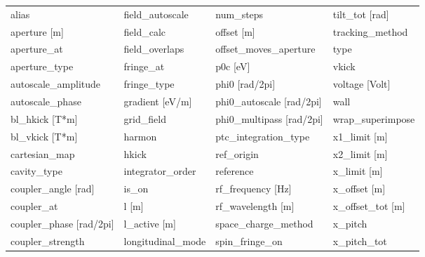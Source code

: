  \begin{tabular}{llll} \toprule
alias                            & field_autoscale                  & num_steps                        & tilt_tot [rad]                   \\
aperture [m]                     & field_calc                       & offset [m]                       & tracking_method                  \\
aperture_at                      & field_overlaps                   & offset_moves_aperture            & type                             \\
aperture_type                    & fringe_at                        & p0c [eV]                         & vkick                            \\
autoscale_amplitude              & fringe_type                      & phi0 [rad/2pi]                   & voltage [Volt]                   \\
autoscale_phase                  & gradient [eV/m]                  & phi0_autoscale [rad/2pi]         & wall                             \\
bl_hkick [T*m]                   & grid_field                       & phi0_multipass [rad/2pi]         & wrap_superimpose                 \\
bl_vkick [T*m]                   & harmon                           & ptc_integration_type             & x1_limit [m]                     \\
cartesian_map                    & hkick                            & ref_origin                       & x2_limit [m]                     \\
cavity_type                      & integrator_order                 & reference                        & x_limit [m]                      \\
coupler_angle [rad]              & is_on                            & rf_frequency [Hz]                & x_offset [m]                     \\
coupler_at                       & l [m]                            & rf_wavelength [m]                & x_offset_tot [m]                 \\
coupler_phase [rad/2pi]          & l_active [m]                     & space_charge_method              & x_pitch                          \\
coupler_strength                 & longitudinal_mode                & spin_fringe_on                   & x_pitch_tot                      \\

\end{tabular}

